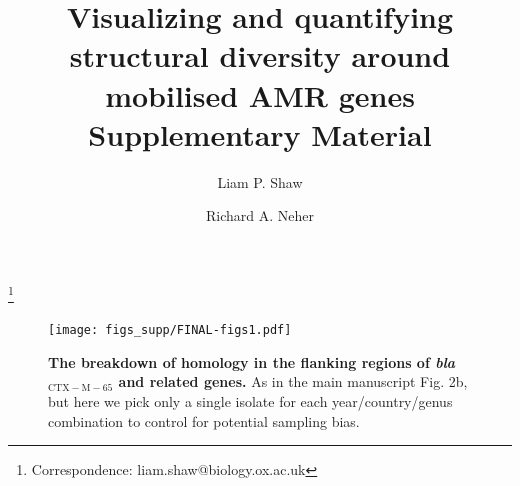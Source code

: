 \documentclass[rmp,superscriptaddress,10pt,onecolumn]{revtex4-1}
\begin{document}
\title{Visualizing and quantifying structural diversity around mobilised AMR genes\\\vspace{3ex} Supplementary Material}
\author{Liam P. Shaw}
\thanks{Correspondence: liam.shaw@biology.ox.ac.uk}
\author{Richard A. Neher}

\maketitle


\begin{figure}[h]
    \centering
    \texttt{[image: figs\_supp/FINAL-figs1.pdf]}
    \caption{\textbf{The breakdown of homology in the flanking regions of \textit{bla}$_\mathrm{CTX-M-65}$ and related genes.} As in the main manuscript Fig. 2b, but here we pick only a single isolate for each year/country/genus combination to control for potential sampling bias.}
    \label{fig:CTX-M-65}
\end{figure}
\end{document}
